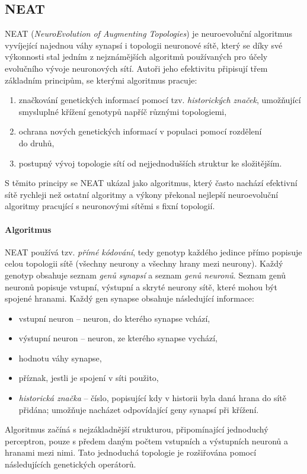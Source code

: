 \subsection{NEAT} \label{NN - NEAT}
NEAT (\emph{NeuroEvolution of Augmenting Topologies})
\citep{stanley2002evolving} je neuroevoluční algoritmus vyvíjející najednou
váhy synapsí i topologii neuronové sítě, který se díky své výkonnosti stal
jedním z nejznámějších algoritmů používaných pro účely evolučního vývoje
neuronových sítí. Autoři jeho efektivitu připisují třem základním principům, se
kterými algoritmus pracuje:
\begin{enumerate}
    \item značkování genetických informací pomocí tzv. \emph{historických značek},
        umožňující smysluplné křížení genotypů napříč různými topologiemi,
   \item ochrana nových genetických informací v populaci pomocí rozdělení\\
       do druhů,
    \item postupný vývoj topologie sítí od nejjednodušších struktur ke
        složitějším.
\end{enumerate}
S těmito principy se NEAT ukázal jako algoritmus, který často nachází efektivní
sítě rychleji než ostatní algoritmy a výkony překonal nejlepší neuroevoluční
algoritmy pracující s neuronovými sítěmi s fixní topologií.

\paragraph{Algoritmus}
NEAT používá tzv. \emph{přímé kódování}, tedy genotyp každého jedince přímo
popisuje celou topologii sítě (všechny neurony a všechny hrany mezi neurony).
Každý genotyp obsahuje seznam \emph{genů synapsí} a seznam \emph{genů neuronů}.
Seznam genů neuronů popisuje vstupní, výstupní a skryté neurony sítě, které
mohou být spojené hranami. Každý gen synapse obsahuje následující informace:
\begin{itemize}
    \item vstupní neuron -- neuron, do kterého synapse vchází,
    \item výstupní neuron -- neuron, ze kterého synapse vychází,
    \item hodnotu váhy synapse,
    \item příznak, jestli je spojení v síti použito,
    \item \emph{historická značka} -- číslo, popisující kdy v historii
        byla daná hrana do sítě přidána; umožňuje nacházet
        odpovídající geny synapsí při křížení.
\end{itemize}
Algoritmus začíná s nejzákladnější strukturou, připomínající jednoduchý
perceptron, pouze s předem daným počtem vstupních a výstupních neuronů a
hranami mezi nimi. Tato jednoduchá topologie je rozšiřována pomocí
následujících genetických operátorů.


